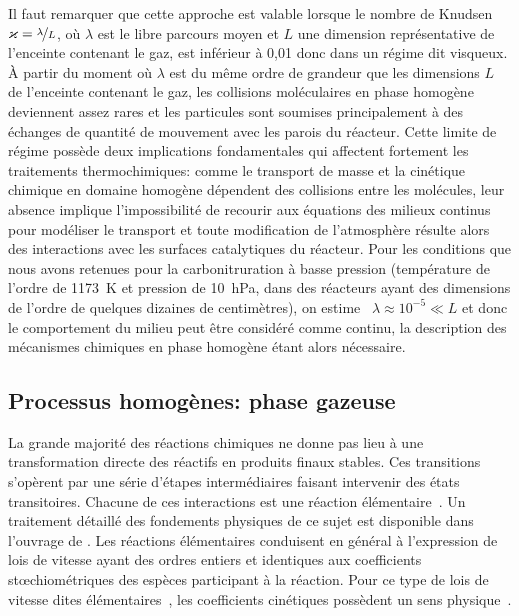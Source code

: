Il faut remarquer que cette approche est valable lorsque le nombre de Knudsen~\cite{Hershey1973} $\varkappa=\nicefrac{\lambda}{L}$, où $\lambda$ est le libre parcours moyen et $L$ une dimension représentative de l'enceinte contenant le gaz, est inférieur à 0,01 \textendash{} donc dans un régime dit visqueux. À partir du moment où $\lambda$ est du même ordre de grandeur que les dimensions $L$ de l'enceinte contenant le gaz, les collisions moléculaires en phase homogène deviennent assez rares et les particules sont soumises principalement à des échanges de quantité de mouvement avec les parois du réacteur. Cette limite de régime possède deux implications fondamentales qui affectent fortement les traitements thermochimiques: comme le transport de masse et la cinétique chimique en domaine homogène dépendent des collisions entre les molécules, leur absence implique l'impossibilité de recourir aux équations des milieux continus pour modéliser le transport et toute modification de l'atmosphère résulte alors des interactions avec les surfaces catalytiques du réacteur. Pour les conditions que nous avons retenues pour la carbonitruration à basse pression (température de l'ordre de \SI{1173}{\kelvin} et pression de \SI{10}{\hecto\pascal}, dans des réacteurs ayant des dimensions de l'ordre de quelques dizaines de centimètres), on estime~\cite{Struchtrup2005} $\lambda\approx{10^{-5}}\ll{L}$ et donc le comportement du milieu peut être considéré comme continu, la description des mécanismes chimiques en phase homogène étant alors nécessaire.

\subsection{Processus homogènes: phase gazeuse}

La grande majorité des réactions chimiques ne donne pas lieu à une transformation directe des réactifs en produits finaux stables. Ces transitions s'opèrent par une série d'étapes intermédiaires faisant intervenir des états transitoires. Chacune de ces interactions est une réaction élémentaire~\cite{Green2007,Henriksen2008}. Un traitement détaillé des fondements physiques de ce sujet est disponible dans l'ouvrage de \citet{Henriksen2008}. Les réactions élémentaires conduisent en général à l'expression de lois de vitesse ayant des ordres entiers et identiques aux coefficients st{\oe}chiométriques des espèces participant à la réaction. Pour ce type de lois de vitesse dites élémentaires~\cite{Fogler1999}, les coefficients cinétiques possèdent un sens physique~\cite{Henriksen2008}.

